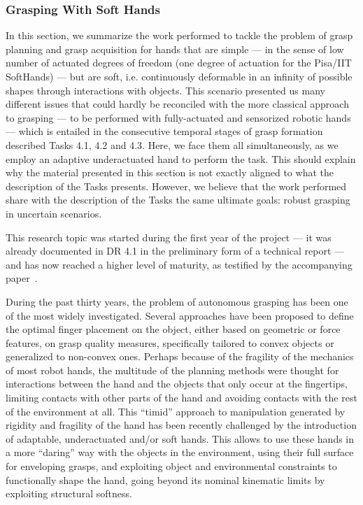
\subsubsection{Grasping With Soft Hands}

In this section, we summarize the work performed to tackle the problem of grasp planning and grasp acquisition for hands that are simple --- in the sense of low number of actuated degrees of freedom (one degree of actuation for the Pisa/IIT SoftHands) --- but are soft, i.e. continuously deformable in an infinity of possible shapes through interactions with objects. This scenario presented us many different issues that could hardly be reconciled with the more classical approach to grasping --- to be performed with fully-actuated and sensorized robotic hands --- which is entailed in the consecutive temporal stages of grasp formation described Tasks 4.1, 4.2 and 4.3. Here, we face them all simultaneously, as we employ an adaptive underactuated hand to perform the task. This should explain why the material presented in this section is not exactly aligned to what the description of the Tasks presents. However, we believe that the work performed share with the description of the Tasks the same ultimate goals: robust grasping in uncertain scenarios.
  
 This research topic was started during the first year of the project --- it was already documented in DR 4.1 in the preliminary form of a technical report --- and has now reached a higher level of maturity, as testified by the accompanying paper~\cite{Bonilla:Humanoids:2015}.

During the past thirty years, the problem of autonomous grasping has been one of the most widely investigated. Several approaches have been proposed to define the optimal finger placement on the object, either based on geometric or force features, on grasp quality measures, specifically tailored to convex objects or generalized to non-convex ones. Perhaps because of the fragility of the mechanics of most robot hands, the multitude of the planning methods were thought for interactions between the hand and the objects that only occur at the fingertips, limiting contacts with other parts of the hand and avoiding contacts with the rest of the environment at all. This ``timid'' approach to manipulation generated by rigidity and fragility of the hand has been recently challenged by the introduction of adaptable, underactuated and/or soft hands. This allows to use these hands in a more ``daring'' way with the objects in the environment, using their full surface for enveloping grasps, and exploiting object and environmental constraints to functionally shape the hand, going beyond its nominal kinematic limits by exploiting structural softness.

